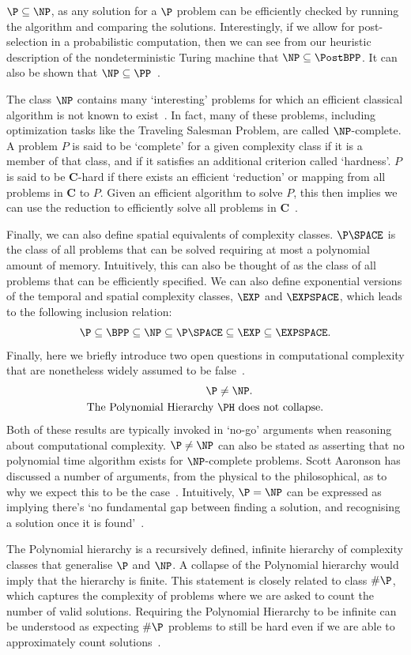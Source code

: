 $\P\subseteq \NP$, as any solution for a $\P$ problem can be efficiently checked by running the algorithm and comparing the solutions. Interestingly, if we allow for post-selection in a probabilistic computation, then we can see from our heuristic description of the nondeterministic Turing machine that $\NP\subseteq \PostBPP$. It can also be shown that $\NP\subseteq \PP$~\cite{Gill1974}.\par
The class $\NP$ contains many `interesting' problems for which an efficient classical algorithm is not known to exist~\cite{Nielsen2000}. In fact, many of these problems, including optimization tasks like the Traveling Salesman Problem, are called $\NP$-complete. A problem $P$ is said to be `complete' for a given complexity class if it is a member of that class, and if it satisfies an additional criterion called `hardness'. $P$ is said to be $\mathbf{C}$-hard if there exists an efficient `reduction' or mapping from all problems in $\mathbf{C}$ to $P$. Given an efficient algorithm to solve $P$, this then implies we can use the reduction to efficiently solve all problems in $\mathbf{C}$~\cite{Nielsen2000}.\par
Finally, we can also define spatial equivalents of complexity classes. $\P\SPACE$ is the class of all problems that can be solved requiring at most a polynomial amount of memory. Intuitively, this can also be thought of as the class of all problems that can be efficiently specified. We can also define exponential versions of the temporal and spatial complexity classes, $\EXP$ and $\EXPSPACE$, which leads to the following inclusion relation:
\[\P\subseteq\BPP\subseteq \NP \subseteq \P\SPACE \subseteq \EXP \subseteq \EXPSPACE. \]
Finally, here we briefly introduce two open questions in computational complexity that are nonetheless widely assumed to be false~\cite{Nielsen2000}.
\begin{align}
    \P &\neq\NP.\\
    \text{The Polynomial Hierarchy } &\PH \text{ does not collapse.}
\end{align}
Both of these results are typically invoked in `no-go' arguments when reasoning about computational complexity. $\P\neq \NP$ can also be stated as asserting that no polynomial time algorithm exists for $\NP$-complete problems. Scott Aaronson has discussed a number of arguments, from the physical to the philosophical, as to why we expect this to be the case~\cite{Aaronson2005,Aaronson2006}. Intuitively, $\P=\NP$ can be expressed as implying there's `no fundamental gap between finding a solution, and recognising a solution once it is found'~\cite{Aaronson2006}.\par
The Polynomial hierarchy is a recursively defined, infinite hierarchy of complexity classes that generalise $\P$ and $\NP$. A collapse of the Polynomial hierarchy would imply that the hierarchy is finite. This statement is closely related to class $\#\P$, which captures the complexity of problems where we are asked to count the number of valid solutions. Requiring the Polynomial Hierarchy to be infinite can be understood as expecting $\#\P$ problems to still be hard even if we are able to approximately count solutions~\cite{Dalzell2017}.
